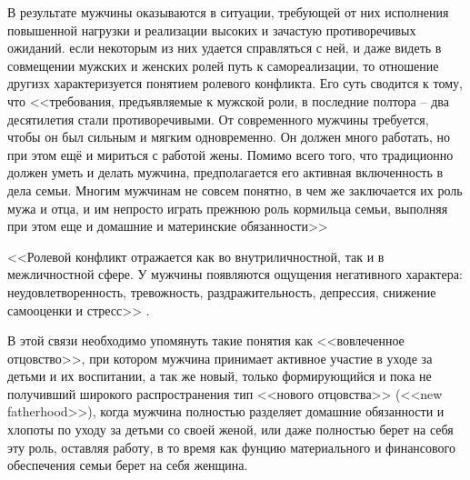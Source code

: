 \documentclass{../../common/thesisbyxetex}
\begin{document}
В результате мужчины оказываются в ситуации, требующей от них исполнения повышенной нагрузки и
реализации высоких и зачастую противоречивых ожиданий. если некоторым из них удается справляться с
ней, и даже видеть в совмещении мужских и женских ролей путь к самореализации, то отношение другизх
характеризуется понятием ролевого конфликта. Его суть сводится к тому, что <<требования,
предъявляемые к мужской роли, в последние полтора – два десятилетия
стали противоречивыми. От современного мужчины требуется, чтобы он был сильным и
мягким одновременно. Он должен много работать, но при этом ещё и мириться с работой
жены. Помимо всего того, что традиционно должен уметь и делать мужчина,
предполагается его активная включенность в дела семьи. Многим мужчинам не совсем
понятно, в чем же заключается их роль мужа и отца, и им непросто играть прежнюю роль
кормильца семьи, выполняя при этом еще и домашние и материнские обязанности>> \cite[112]{confl}













<<Ролевой конфликт отражается как во внутриличностной, так и в межличностной
сфере. У мужчины появляются ощущения негативного характера: неудовлетворенность,
тревожность, раздражительность, депрессия, снижение самооценки и стресс>> \cite[113]{confl}.






В этой связи необходимо упомянуть такие понятия как <<вовлеченное отцовство>>,
при котором мужчина принимает активное участие в уходе за детьми и их воспитании, а так же
новый,  только формирующийся и пока не получивший широкого распространения  тип <<нового
отцовства>> (<<new fatherhood>>), когда мужчина полностью разделяет домашние обязанности и хлопоты
по уходу за детьми со своей женой, или даже полностью берет на себя эту роль, оставляя работу, в то
время как фунцию материального и финансового обеспечения семьи берет на себя женщина.
\end{document}
